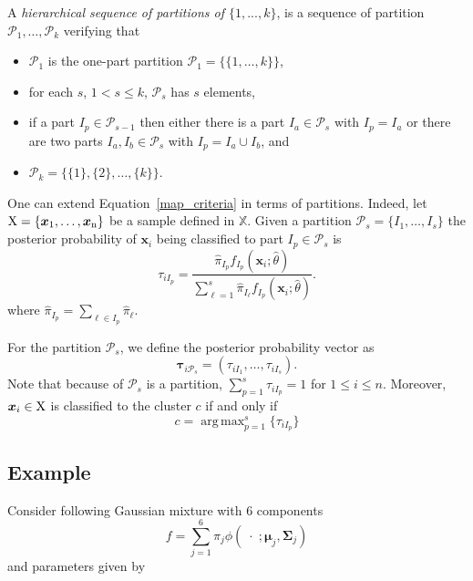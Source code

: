 \documentclass[10pt, a4paper]{article}
\DeclareMathOperator*{\argmax}{arg\,max}
\newcommand{\m}[1]{\boldsymbol{#1}}
\begin{document}
\begin{spacing}{1.9}
A \emph{hierarchical sequence of partitions of $\{1,...,k\}$}, is a sequence of partition $\mathcal{P}_1, \dots, \mathcal{P}_k$ verifying that
\begin{itemize}
\item $\mathcal{P}_1$ is the one-part partition $\mathcal{P}_1 = \{ \{1, \dots, k\} \}$,
\item for each $s$, $1 <  s \leq k$, $\mathcal{P}_{s}$ has $s$ elements,
\item if a part $I_p \in \mathcal{P}_{s-1}$ then either there is a part $I_a \in \mathcal{P}_{s}$ with $I_p = I_a$ or there are two parts $I_a, I_b \in \mathcal{P}_s$ with $I_p = I_a \cup I_b$, and
\item $\mathcal{P}_k= \{ \{1\},\{2\}, \dots, \{k\} \}$.
\end{itemize}



One can extend Equation~\ref{map_criteria} in terms of partitions. Indeed, let $\rm X = \{\m x_1,\dots, \m x_n\}$ be a sample defined in $\mathbb{X}$. Given a partition $\mathcal{P}_s = \{ I_1, \dots, I_s \}$ the posterior probability of $\m x_i$ being classified to part $I_p\in \mathcal{P}_{s}$ is
\[
\tau_{i I_p} =  \frac{ \hat{\pi}_{I_p} f_{I_p}(\m x_i; \hat{\theta}) }{\sum_{\ell=1}^s \hat{\pi}_{I_\ell} f_{I_p}(\m x_i; \hat{\theta})}.
\]
where $\hat{\pi}_{I_p} = \sum_{\ell \in I_p} \hat{\pi}_\ell$.

For the partition  $\mathcal{P}_s$, we define the posterior probability vector as
\begin{equation}\label{ppv}
\m\tau_{i \mathcal{P}_s} = \left(\tau_{i I_1} , \dots, \tau_{i I_s}  \right).
\end{equation}
Note that because of $\mathcal{P}_s$ is a partition, $\sum_{p=1}^s \tau_{i I_p} = 1$ for $1 \leq i \leq n$.
Moreover, $\m x_i \in \rm X$ is classified to the cluster $c$ if and only if
\begin{equation}\label{cluster_criteria}
c= \argmax_{p=1}^s \{ \tau_{i I_p} \}
\end{equation}

\subsection{Example} \label{example}

Consider following Gaussian mixture with 6 components
\[
f= \sum_{j=1}^6 \pi_j \phi(\;\cdot\; ;  \m\mu_j, \m\Sigma_j)
\]
and parameters given by
{\small  }


\end{spacing}
\end{document}
